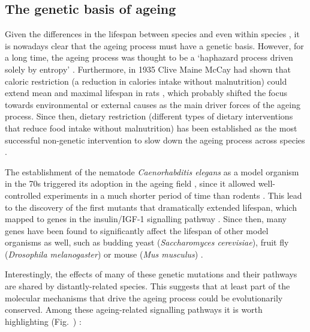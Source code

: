 \smallskip

\subsection{The genetic basis of ageing}

\smallskip

Given the differences in the lifespan between species and even within species \cite{Jones2013, Gems2000}, it is nowadays clear that the ageing process must have a genetic basis. However, for a long time, the ageing process was thought to be a `haphazard process driven solely by entropy' \cite{Kenyon2005}. Furthermore, in 1935 Clive Maine McCay had shown that caloric restriction (a reduction in calories intake without malnutrition) could extend mean and maximal lifespan in rats \cite{McCay1935,McDonald2010}, which probably shifted the focus towards environmental or external causes as the main driver forces of the ageing process. Since then, dietary restriction (different types of dietary interventions that reduce food intake without malnutrition) has been established as the most successful non-genetic intervention to slow down the ageing process across species \cite{Fontana2015}.

\bigskip

The establishment of the nematode \textit{Caenorhabditis elegans} as a model organism in the 70s triggered its adoption in the ageing field \cite{KLASS1976}, since it allowed well-controlled experiments in a much shorter period of time than rodents \cite{Johnson2013}. This lead to the discovery of the first mutants that dramatically extended lifespan, which mapped to genes in the insulin/IGF-1 signalling pathway \cite{Kenyon1993,Morris1996}. Since then, many genes have been found to significantly affect the lifespan of other model organisms as well, such as budding yeast (\textit{Saccharomyces cerevisiae}), fruit fly (\textit{Drosophila melanogaster}) or mouse (\textit{Mus musculus}) \cite{Kenyon2005,Kenyon2010,Singh2019}. 

\bigskip

Interestingly, the effects of many of these genetic mutations and their pathways are shared by distantly-related species. This suggests that at least part of the molecular mechanisms that drive the ageing process could be evolutionarily conserved. Among these ageing-related signalling pathways it is worth highlighting (Fig.~) \cite{Kenyon2005,Kenyon2010,Singh2019,Greer2008}:

